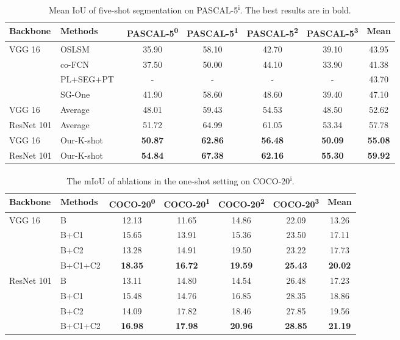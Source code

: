 \documentclass[10pt,twocolumn,letterpaper]{article}
\begin{document}
\begin{table*}[t]
  \centering
  \begin{tabular}{l|l|cccc|c}
    \hline
    \hline
     \textbf{Backbone} & \textbf{Methods} & \textbf{PASCAL-5\textsuperscript{0}} & \textbf{PASCAL-5\textsuperscript{1}} & \textbf{PASCAL-5\textsuperscript{2}} & \textbf{PASCAL-5\textsuperscript{3}} & \textbf{Mean} \\
    \hline
	VGG 16 & OSLSM~\cite{shaban2017one} &  35.90 & 58.10 & 42.70 & 39.10 & 43.95 \\
& co-FCN~\cite{rakelly2018conditional} &  37.50  & 50.00 & 44.10 & 33.90 & 41.38 \\
& PL+SEG+PT~\cite{dong2018few} &  -  & - & - & - & 43.70 \\
    & SG-One ~\cite{zhang2018sgone} & 41.90  & 58.60 & 48.60 & 39.40 & 47.10 \\
\hline
    VGG 16 & Average  & 48.01  & 59.43 & 54.53  & 48.50 & 52.62 \\
    ResNet 101 & Average  & 51.72  & 64.99 & 61.05  & 53.34 & 57.78 \\
    \hline
    VGG 16 & Our-K-shot  & \textbf{50.87}  & \textbf{62.86} & \textbf{56.48}  & \textbf{50.09} & \textbf{55.08} \\
    ResNet 101 & Our-K-shot  & \textbf{54.84}  & \textbf{67.38} & \textbf{62.16}  &\textbf{55.30}& \textbf{59.92} \\
    \hline
    \hline
  \end{tabular}
  \caption{Mean IoU  of five-shot segmentation on PASCAL-5\textsuperscript{i}. The best results are in bold.}\label{tab:five-shot}
\end{table*}


\begin{table*}[t]
  \centering
  \begin{tabular}{l|l|cccc|c}
    \hline
    \hline
    \textbf{Backbone} & \textbf{Methods} & \textbf{COCO-20\textsuperscript{0}} & \textbf{COCO-20\textsuperscript{1}} & \textbf{COCO-20\textsuperscript{2}} & \textbf{COCO-20\textsuperscript{3}} & \textbf{Mean} \\
    \hline
    VGG 16 & B &  12.13 & 11.65 & 14.86  & 22.09 & 13.26 \\
    & B+C1 & 15.65  & 13.91 & 15.36  & 23.50 & 17.11 \\
    & B+C2 & 13.28 & 14.91 & 19.50  & 23.22 & 17.73 \\
    & B+C1+C2 & \textbf{18.35} & \textbf{16.72} & \textbf{19.59}  & \textbf{25.43} & \textbf{20.02} \\
    \hline
    ResNet 101 & B & 13.11  & 14.80 & 14.54 & 26.48  &  17.23 \\
    & B+C1 & 15.48  & 14.76 & 16.85  & 28.35 & 18.86 \\
    & B+C2 & 14.09  & 17.82 & 18.46  & 27.85 & 19.56 \\
    & B+C1+C2 & \textbf{16.98} & \textbf{17.98} & \textbf{20.96}  & \textbf{28.85} & \textbf{21.19} \\
    \hline
    \hline
  \end{tabular}
  \caption{The mIoU of ablations in the one-shot setting on COCO-20\textsuperscript{i}.}\label{tab:result_coco_one}
\end{table*}
\end{document}

